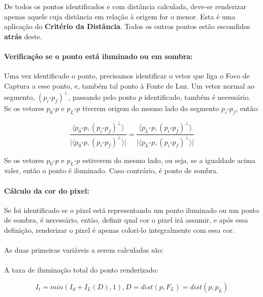 \documentclass{article}
\begin{document}
	De todos os pontos identificados e com distância calculada, deve-se renderizar apenas aquele cuja distância em relação à origem for o menor. Esta é uma aplicação do \textbf{Critério da Distância}. Todos os outros pontos estão escondidos \textbf{atrás} deste.
	
	\paragraph{Verificação se o ponto está iluminado ou em sombra:}
	Uma vez identificado o ponto, precisamos identificar o vetor que liga o Foco de Captura a esse ponto, e, também tal ponto à Fonte de Luz. Um vetor normal ao segmento,  $(p_i\text{-}p_f)^\bot$, passando pelo ponto $p$ identificado, também é necessário. Se os vetores $p_0$-$p$ e $p_{L}$-$p$ tiverem origem do mesmo lado do segmento $p_i$-$p_f$, então:
	
	$$\frac{\langle p_0\text{-}p , (p_i\text{-}p_f)^\bot \rangle}{\lvert \langle p_0\text{-}p , (p_i\text{-}p_f)^\bot \rangle \rvert} = \frac{\langle p_L\text{-}p , (p_i\text{-}p_f)^\bot \rangle}{\lvert \langle p_L\text{-}p , (p_i\text{-}p_f)^\bot \rangle \rvert}$$
	
	Se os vetores $p_0\text{-}p$ e $p_L\text{-}p$ estiverem do mesmo lado, ou seja, se a igualdade acima valer, então o ponto é iluminado. Caso contrário, é ponto de sombra.
	
	\paragraph{Cálculo da cor do pixel: }
	Se foi identificado se o pixel está representando um ponto iluminado ou um ponto de sombra, é necessário, então, definir qual cor o pixel irá assumir, e após essa definição, renderizar o pixel é apenas colori-lo integralmente com essa cor.
	
	\paragraph{}
	As duas primeiras variáveis a serem calculadas são:
	
	\paragraph{}
	A taxa de iluminação total do ponto renderizado: 
	
	\begin{equation} \label{eq:2}
	I_t = min(I_d + I_L(D), 1), D = dist(p, F_L) = dist(p, p_L)
	\end{equation}
	
\end{document}
